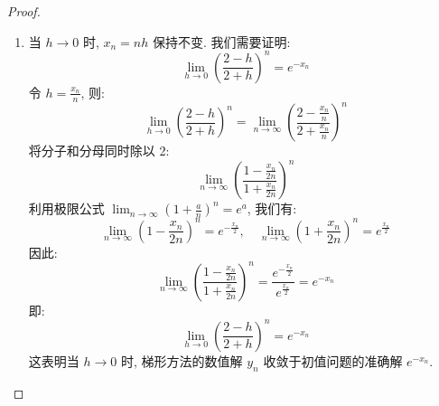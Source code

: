 \documentclass[lang = zh]{iwork}
\begin{document}
\begin{proof}
\begin{enumerate}
    \item 当 $h \to 0$ 时, $x_n = n h$ 保持不变.
          我们需要证明:
          \begin{equation*}
            \lim_{h \to 0} \left(\frac{2 - h}{2 + h}\right)^n = e^{-x_n}
          \end{equation*}
          令 $h = \frac{x_n}{n}$, 则:
          \begin{equation*}
            \lim_{h \to 0} \left(\frac{2 - h}{2 + h}\right)^n = \lim_{n \to \infty} \left(\frac{2 - \frac{x_n}{n}}{2 + \frac{x_n}{n}}\right)^n
          \end{equation*}
          将分子和分母同时除以 2:
          \begin{equation*}
            \lim_{n \to \infty} \left(\frac{1 - \frac{x_n}{2n}}{1 + \frac{x_n}{2n}}\right)^n
          \end{equation*}
          利用极限公式 $\lim_{n \to \infty} \left(1 + \frac{a}{n}\right)^n = e^a$, 我们有:
          \begin{equation*}
            \lim_{n \to \infty} \left(1 - \frac{x_n}{2n}\right)^n = e^{-\frac{x_n}{2}}, \quad
            \lim_{n \to \infty} \left(1 + \frac{x_n}{2n}\right)^n = e^{\frac{x_n}{2}}
          \end{equation*}
          因此:
          \begin{equation*}
            \lim_{n \to \infty} \left(\frac{1 - \frac{x_n}{2n}}{1 + \frac{x_n}{2n}}\right)^n
            = \frac{e^{-\frac{x_n}{2}}}{e^{\frac{x_n}{2}}}
            = e^{-x_n}
          \end{equation*}
          即:
          \begin{equation*}
            \lim_{h \to 0} \left(\frac{2 - h}{2 + h}\right)^n = e^{-x_n}
          \end{equation*}
          这表明当 $h \to 0$ 时, 梯形方法的数值解 $y_n$ 收敛于初值问题的准确解 $e^{-x_n}$.
  \end{enumerate}
\end{proof}
\end{document}
